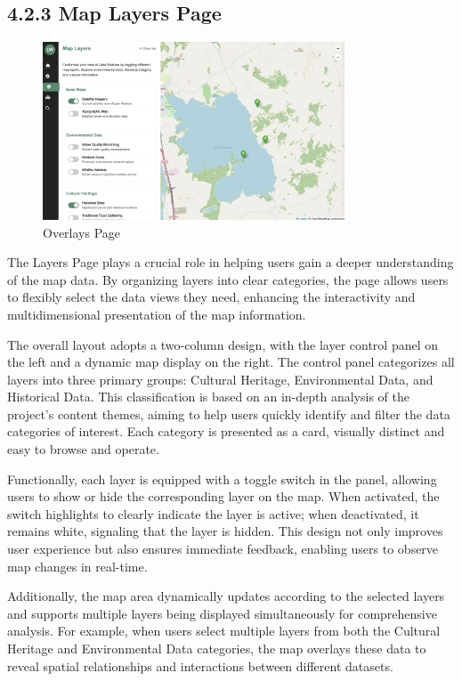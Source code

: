 \subsection*{4.2.3 Map Layers Page}
\begin{figure}[H]
    \centering
    \includegraphics[width=0.8\textwidth]{screenshot/prototype_overlay.png}
    \caption{Overlays Page}
    \label{fig:architecture}
\end{figure}

The Layers Page plays a crucial role in helping users gain a deeper understanding of the map data. By organizing layers into clear categories, the page allows users to flexibly select the data views they need, enhancing the interactivity and multidimensional presentation of the map information.

The overall layout adopts a two-column design, with the layer control panel on the left and a dynamic map display on the right. The control panel categorizes all layers into three primary groups: Cultural Heritage, Environmental Data, and Historical Data. This classification is based on an in-depth analysis of the project's content themes, aiming to help users quickly identify and filter the data categories of interest. Each category is presented as a card, visually distinct and easy to browse and operate.

Functionally, each layer is equipped with a toggle switch in the panel, allowing users to show or hide the corresponding layer on the map. When activated, the switch highlights to clearly indicate the layer is active; when deactivated, it remains white, signaling that the layer is hidden. This design not only improves user experience but also ensures immediate feedback, enabling users to observe map changes in real-time.

Additionally, the map area dynamically updates according to the selected layers and supports multiple layers being displayed simultaneously for comprehensive analysis. For example, when users select multiple layers from both the Cultural Heritage and Environmental Data categories, the map overlays these data to reveal spatial relationships and interactions between different datasets.

